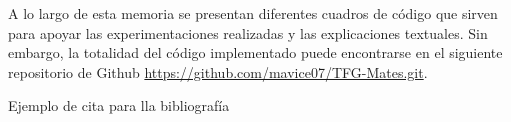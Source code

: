 A lo largo de esta memoria se presentan diferentes cuadros de código que sirven para apoyar las experimentaciones realizadas y las explicaciones textuales. Sin embargo, la totalidad del código implementado puede encontrarse en el siguiente repositorio de Github \url{https://github.com/mavice07/TFG-Mates.git}.

Ejemplo de cita para lla bibliografía \cite{Sanchez2022}
